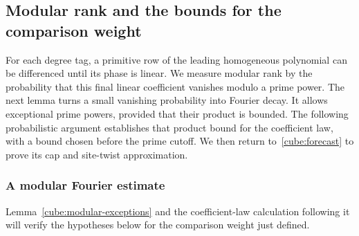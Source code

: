 \subsection{Modular rank and the bounds for the comparison weight}

For each degree tag, a primitive row of the leading homogeneous
polynomial can be differenced until its phase is linear. We
measure modular rank by the probability that this final linear
coefficient vanishes modulo a prime power. The next lemma turns
a small vanishing probability into Fourier decay. It allows
exceptional prime powers, provided that their product is bounded.
The following probabilistic argument establishes that product
bound for the coefficient law, with a bound chosen before the
prime cutoff. We then return to~\eqref{cube:forecast} to prove
its cap and site-twist approximation.

\subsubsection{A modular Fourier estimate}

Lemma~\ref{cube:modular-exceptions} and the coefficient-law
calculation following it will verify the hypotheses below for
the comparison weight just defined.

